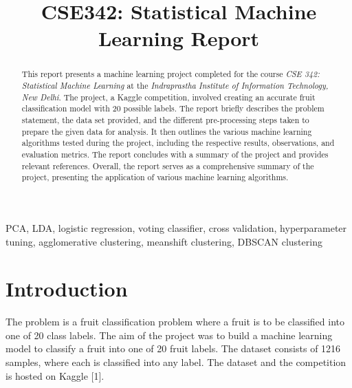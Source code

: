 \documentclass[conference]{IEEEtran}
\begin{document}
\title{CSE342: Statistical Machine Learning Report}

\makeatletter
\newcommand{\linebreakand}{%
  \end{@IEEEauthorhalign}
  \hfill\mbox{}\par
  \mbox{}\hfill\begin{@IEEEauthorhalign}
}
\makeatother


\author{
    \and
}

\maketitle

\begin{abstract}
    This report presents a machine learning project completed for the course \textit{CSE 342: Statistical Machine Learning} at the \textit{Indraprastha Institute of Information Technology, New Delhi}. The project, a Kaggle competition, involved creating an accurate fruit classification model with 20 possible labels. 
    The report briefly describes the problem statement, the data set provided, and the different pre-processing steps taken to prepare the given data for analysis. It then outlines the various machine learning algorithms tested during the project, including the respective results, observations, and evaluation metrics. 
    The report concludes with a summary of the project and provides relevant references. Overall, the report serves as a comprehensive summary of the project, presenting the application of various machine learning algorithms.
\end{abstract}
\begin{IEEEkeywords}
    PCA, LDA, logistic regression, voting classifier, cross validation, hyperparameter tuning, agglomerative clustering, meanshift clustering, DBSCAN clustering
\end{IEEEkeywords}

\section{Introduction}
    The problem is a fruit classification problem where a fruit is to be classified into one of 20 class labels.
    The aim of the project was to build a machine learning model to classify a fruit into one of 20 fruit labels. The dataset consists of 1216 samples, where each is classified into any label. The dataset and the competition is hosted on Kaggle [1]. 
\end{document}
